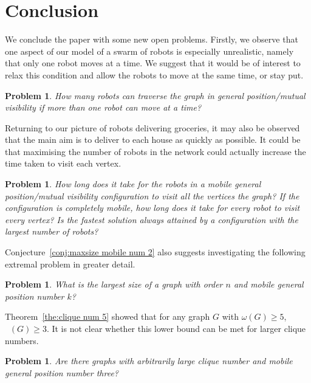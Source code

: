 \documentclass[a4paper,12pt]{article}
\DeclareMathOperator{\mob}{Mob_{gp}}
\newtheorem{problem}[theorem]{Problem}
\theoremstyle{definition}
\begin{document}
	
	\section{Conclusion}\label{sec:conclusion}
	
	We conclude the paper with some new open problems. Firstly, we observe that one aspect of our model of a swarm of robots is especially unrealistic, namely that only one robot moves at a time. We suggest that it would be of interest to relax this condition and allow the robots to move at the same time, or stay put.
	
	\begin{problem}
		How many robots can traverse the graph in general position/mutual visibility if more than one robot can move at a time?
	\end{problem}
	
	Returning to our picture of robots delivering groceries, it may also be observed that the main aim is to deliver to each house as quickly as possible. It could be that maximising the number of robots in the network could actually increase the time taken to visit each vertex. 
	
	\begin{problem}
		How long does it take for the robots in a mobile general position/mutual visibility configuration to visit all the vertices the graph? If the configuration is completely mobile, how long does it take for every robot to visit every vertex? Is the fastest solution always attained by a configuration with the largest number of robots?
	\end{problem}
	
	Conjecture~\ref{conj:maxsize mobile num 2} also suggests investigating the following extremal problem in greater detail.
	
	\begin{problem}
		What is the largest size of a graph with order $n$ and mobile general position number $k$?
	\end{problem}
	
	Theorem~\ref{the:clique num 5} showed that for any graph $G$ with $\omega(G) \geq 5$, $\mob(G) \geq 3$. It is not clear whether this lower bound can be met for larger clique numbers.
	
	\begin{problem}
		Are there graphs with arbitrarily large clique number and mobile general position number three?
	\end{problem}
	
	
\end{document}
